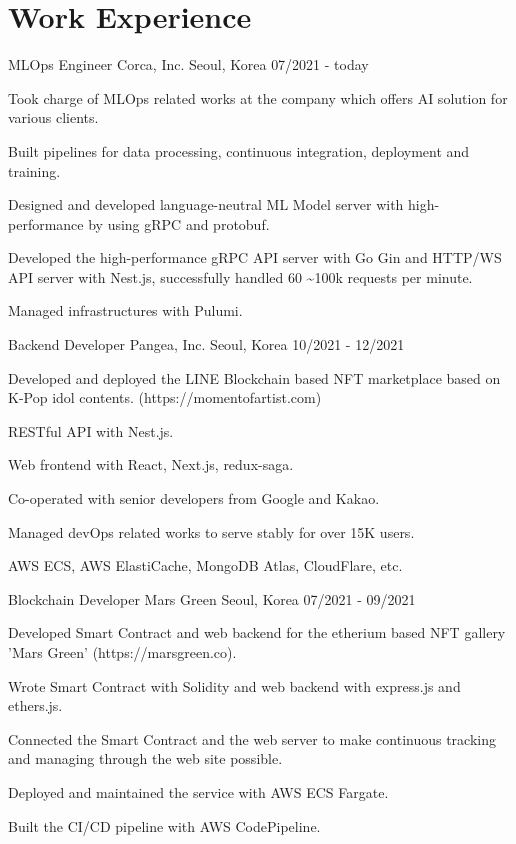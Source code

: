 \section{Work Experience}

\cventry
{MLOps Engineer} %
{Corca, Inc.} %
{Seoul, Korea} %
{07/2021 - today} %
\begin{cvitems}
\item {Took charge of MLOps related works at the company which offers AI solution for various clients.}
\item {Built pipelines for data processing, continuous integration, deployment and training.}
\item {Designed and developed language-neutral ML Model server with high-performance by using gRPC and protobuf.}
\item {Developed the high-performance gRPC API server with Go Gin and HTTP/WS API server with Nest.js, successfully handled 60 \textasciitilde 100k requests per minute.}
\item {Managed infrastructures with Pulumi.}
\end{cvitems}

\cventry
{Backend Developer} %
{Pangea, Inc.} %
{Seoul, Korea} %
{10/2021 - 12/2021} %
\begin{cvitems}
\item {Developed and deployed the LINE Blockchain based NFT marketplace based on K-Pop idol contents. (https://momentofartist.com)}
\item {RESTful API with Nest.js.}
\item {Web frontend with React, Next.js, redux-saga.}
\item {Co-operated with senior developers from Google and Kakao.}
\item {Managed devOps related works to serve stably for over 15K users.}
\item {AWS ECS, AWS ElastiCache, MongoDB Atlas, CloudFlare, etc.}
\end{cvitems}

\cventry
{Blockchain Developer} %
{Mars Green} %
{Seoul, Korea} %
{07/2021 - 09/2021} %
\begin{cvitems}
\item {Developed Smart Contract and web backend for the etherium based NFT gallery 'Mars Green' (https://marsgreen.co).}
\item {Wrote Smart Contract with Solidity and web backend with express.js and ethers.js.}
\item {Connected the Smart Contract and the web server to make continuous tracking and managing through the web site possible.}
\item {Deployed and maintained the service with AWS ECS Fargate.}
\item {Built the CI/CD pipeline with AWS CodePipeline.}
\end{cvitems}


